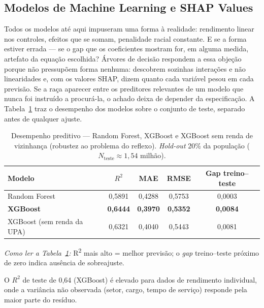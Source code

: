 \documentclass[12pt, a4paper, oneside]{article}
\let\oldsubsectionFB\subsection
\renewcommand{\subsection}{\FloatBarrier\oldsubsectionFB}
\begin{document}


\subsection{Modelos de Machine Learning e SHAP Values}
\label{subsec:ml}

Todos os modelos até aqui impuseram uma forma à realidade: rendimento linear nos
controles, efeitos que se somam, penalidade racial constante. E se a forma estiver
errada --- se o gap que os coeficientes mostram for, em alguma medida, artefato da
equação escolhida? Árvores de decisão respondem a essa objeção porque não pressupõem
forma nenhuma: descobrem sozinhas interações e não linearidades e, com os valores SHAP,
dizem quanto cada variável pesou em cada previsão. Se a raça aparecer entre os
preditores relevantes de um modelo que nunca foi instruído a procurá-la, o achado deixa
de depender da especificação. A Tabela~\ref{tab:ml_perf} traz o desempenho dos modelos
sobre o conjunto de teste, separado antes de qualquer ajuste.

\begin{table}[H]
\centering
\caption{Desempenho preditivo --- Random Forest, XGBoost e XGBoost sem renda de vizinhança (robustez ao problema do reflexo).
          \textit{Hold-out} 20\% da população ($N_\text{teste}\approx 1{,}54$ milhão).}
\label{tab:ml_perf}
\begin{tabular}{lcccc}
\toprule
\textbf{Modelo} & $R^2$ & \textbf{MAE} & \textbf{RMSE} & \textbf{Gap treino--teste} \\
\midrule
Random Forest & 0,5891 & 0,4288 & 0,5753 & 0,0003 \\
\textbf{XGBoost} & \textbf{0,6444} & \textbf{0,3970} & \textbf{0,5352} & \textbf{0,0084} \\
XGBoost (sem renda da UPA) & 0,6321 & 0,4040 & 0,5443 & 0,0081 \\
\bottomrule
\end{tabular}
\end{table}
\noindent\emph{Como ler a Tabela~\ref{tab:ml_perf}:} R\textsuperscript{2} mais alto = melhor previsão; o \emph{gap} treino--teste próximo de zero indica ausência de sobreajuste.

O $R^2$ de teste de 0{,}64 (XGBoost) é elevado para dados de rendimento individual,
onde a variância não observada (setor, cargo, tempo de serviço) responde
pela maior parte do resíduo.
\end{document}
